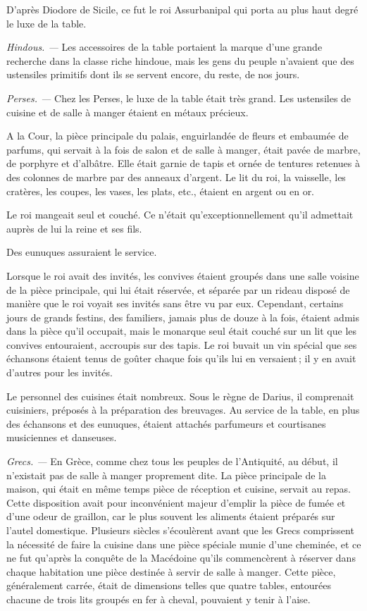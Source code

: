 D'après Diodore de Sicile, ce fut le roi Assurbanipal qui porta au plus haut
degré le luxe de la table.

\sk 

\textit{Hindous. —} Les accessoires de la table portaient la marque d'une
grande recherche dans la classe riche hindoue, mais les gens du peuple
n'avaient que des ustensiles primitifs dont ils se servent encore, du reste, de
nos jours.

\sk

\textit{Perses. —} Chez les Perses, le luxe de la table était très grand. Les
ustensiles de cuisine et de salle à manger étaient en métaux précieux.

A la Cour, la pièce principale du palais, enguirlandée de fleurs et embaumée de
parfums, qui servait à la fois de salon et de salle à manger, était pavée de
marbre, de porphyre et d'albâtre. Elle était garnie de tapis et ornée de
tentures retenues à des colonnes de marbre par des anneaux d'argent. Le lit du
roi, la vaisselle, les cratères, les coupes, les vases, les plats, etc.,
étaient en argent ou en or.

Le roi mangeait seul et couché. Ce n'était qu'exceptionnellement qu'il
admettait auprès de lui la reine et ses fils.

Des eunuques assuraient le service.

Lorsque le roi avait des invités, les convives étaient groupés dans une salle
voisine de la pièce principale, qui lui était réservée, et séparée par un
rideau disposé de manière que le roi voyait ses invités sans être vu par eux.
Cependant, certains jours de grands festins, des familiers, jamais plus de
douze à la fois, étaient admis dans la pièce qu'il occupait, mais le monarque
seul était couché sur un lit que les convives entouraient, accroupis sur des
tapis. Le roi buvait un vin spécial que ses échansons étaient tenus de goûter
chaque fois qu'ils lui en versaient ; il y en avait d'autres pour les invités.

Le personnel des cuisines était nombreux. Sous le règne de Darius, il
comprenait {\mmm} cuisiniers, {\mmm} préposés à la préparation des
breuvages. Au service de la table, en plus des échansons et des eunuques,
étaient attachés {\mmm} parfumeurs et {\mmm} courtisanes
musiciennes et danseuses.

\sk

\textit{Grecs. —} En Grèce, comme chez tous les peuples de l'Antiquité, au
début, il n'existait pas de salle à manger proprement dite. La pièce principale
de la maison, qui était en même temps pièce de réception et cuisine, servait au
repas. Cette disposition avait pour inconvénient majeur d'emplir la pièce de
fumée et d’une odeur de graillon, car le plus souvent les aliments étaient
préparés sur l'autel domestique. Plusieurs siècles s'écoulèrent avant que les
Grecs comprissent la nécessité de faire la cuisine dans une pièce spéciale
munie d'une cheminée, et ce ne fut qu'après la conquête de la Macédoine qu'ils
commencèrent à réserver dans chaque habitation une pièce destinée à servir de
salle à manger. Cette pièce, généralement carrée, était de dimensions telles
que quatre tables, entourées chacune de trois lits groupés en fer à cheval,
pouvaient y tenir à l'aise.

